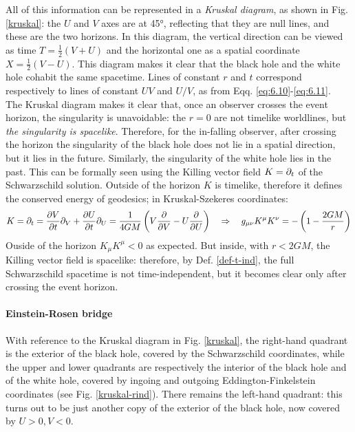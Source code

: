 All of this information can be represented in a \textit{Kruskal diagram}, as shown in Fig. \ref{kruskal}: the $ U $ and $ V $ axes are at 45°, reflecting that they are null lines, and these are the two horizons. In this diagram, the vertical direction can be viewed as time $ T = \frac{1}{2} (V + U) $ and the horizontal one as a spatial coordinate $ X = \frac{1}{2} (V - U) $. This diagram makes it clear that the black hole and the white hole cohabit the same spacetime. Lines of constant $ r $ and $ t $ correspond respectively to lines of constant $ UV $ and $ U/V $, as from Eqq. \ref{eq:6.10}-\ref{eq:6.11}.\\
The Kruskal diagram makes it clear that, once an observer crosses the event horizon, the singularity is unavoidable: the $ r = 0 $ are not timelike worldlines, but \textit{the singularity is spacelike}. Therefore, for the in-falling observer, after crossing the horizon the singularity of the black hole does not lie in a spatial direction, but it lies in the future. Similarly, the singularity of the white hole lies in the past. This can be formally seen using the Killing vector field $ K = \partial_t $ of the Schwarzschild solution. Outside of the horizon $ K $ is timelike, therefore it defines the conserved energy of geodesics; in Kruskal-Szekeres coordinates:
\begin{equation*}
  K = \partial_t = \frac{\partial V}{\partial t} \partial_V + \frac{\partial U}{\partial t} \partial_U = \frac{1}{4GM} \left( V \frac{\partial}{\partial V} - U \frac{\partial}{\partial U} \right)
  \quad \Rightarrow \quad
  g_{\mu \nu} K^\mu K^\nu = - \left( 1 - \frac{2GM}{r} \right)
\end{equation*}
Ouside of the horizon $ K_\mu K^\mu < 0 $ as expected. But inside, with $ r < 2GM $, the Killing vector field is spacelike: therefore, by Def. \ref{def-t-ind}, the full Schwarzschild spacetime is not time-independent, but it becomes clear only after crossing the event horizon.

\paragraph{Einstein-Rosen bridge}

With reference to the Kruskal diagram in Fig. \ref{kruskal}, the right-hand quadrant is the exterior of the black hole, covered by the Schwarzschild coordinates, while the upper and lower quadrants are respectively the interior of the black hole and of the white hole, covered by ingoing and outgoing Eddington-Finkelstein coordinates (see Fig. \ref{kruskal-rind}). There remains the left-hand quadrant: this turns out to be just another copy of the exterior of the black hole, now covered by $ U > 0, V < 0 $.

